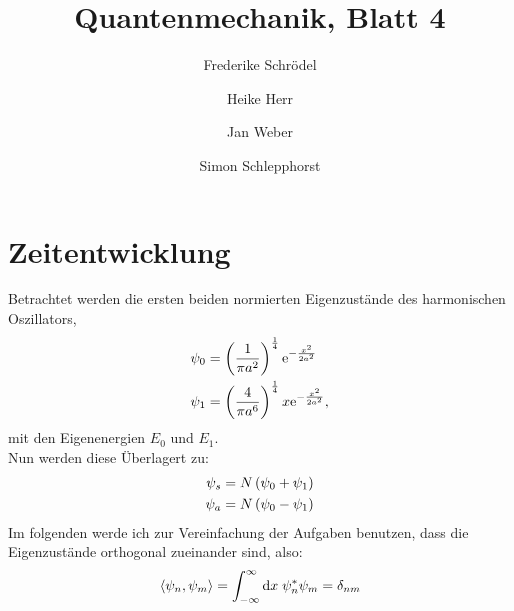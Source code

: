 \documentclass[11pt, ngerman, fleqn, DIV=15, headinclude]{scrartcl}
\title{Quantenmechanik, Blatt 4}
\author{
    Frederike Schrödel \and Heike Herr \and Jan Weber \and Simon Schlepphorst
}
\begin{document}
\maketitle

\section{Zeitentwicklung}

Betrachtet werden die ersten beiden normierten Eigenzustände des harmonischen Oszillators,
\begin{align*}
	\psi_0	&= \left( \frac1{\pi a^2} \right)^{\frac14} \mathrm e^{-\frac{x^2}{2a^2}}\\
	\psi_1	&= \left( \frac4{\pi a^6} \right)^{\frac14} x \mathrm e^{-\frac{x^2}{2a^2}},
\end{align*}
mit den Eigenenergien $E_0$ und $E_1$.\\
Nun werden diese Überlagert zu:
\begin{align*}
	\psi_s	&= N\left( \psi_0 + \psi_1 \right)\\
	\psi_a	&= N\left( \psi_0 - \psi_1 \right)
\end{align*}
Im folgenden werde ich zur Vereinfachung der Aufgaben benutzen, dass die Eigenzustände orthogonal zueinander sind, also:
\begin{align*}
	\left<\psi_n,\psi_m\right> = \int_{-\infty}^{\infty}\mathop{}\!\mathrm d x\; \psi_n^*\psi_m = \delta_{nm}
\end{align*}

\subsection{}
\end{document}
